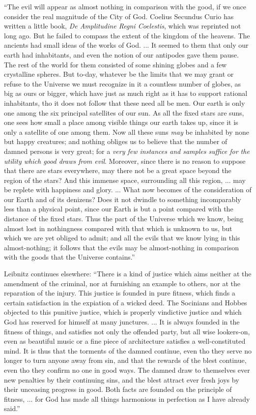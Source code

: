 \documentclass[]{article}
\begin{document}
``The evil will appear as almost nothing in comparison with the good, if
we once consider the real magnitude of the City of God. Coelius Secundus
Curio has written a little book, \emph{De Amplitudine Regni Coelestis}, which
was reprinted not long ago. But he failed to compass the extent of the
kingdom of the heavens. The ancients had small ideas of the works of
God. ... It seemed to them that only our earth had inhabitants, and even
the notion of our antipodes gave them pause. The rest of the world for
them consisted of some shining globes and a few crystalline spheres.
But to-day, whatever be the limits that we may grant or refuse to the
Universe we must recognize in it a countless number of globes, as big
as ours or bigger, which have just as much right as it has to support
rational inhabitants, tho it does not follow that these need all be men.
Our earth is only one among the six principal satellites of our sun. As
all the fixed stars are suns, one sees how small a place among visible
things our earth takes up, since it is only a satellite of one among
them. Now all these suns \emph{may} be inhabited by none but happy creatures;
and nothing obliges us to believe that the number of damned persons is
very great; for a \emph{very few instances and samples suffice for the utility
which good draws from evil}. Moreover, since there is no reason to
suppose that there are stars everywhere, may there not be a great space
beyond the region of the stars? And this immense space, surrounding all
this region, ... may be replete with happiness and glory. ... What now
becomes of the consideration of our Earth and of its denizens? Does it
not dwindle to something incomparably less than a physical point, since
our Earth is but a point compared with the distance of the fixed stars.
Thus the part of the Universe which we know, being almost lost in
nothingness compared with that which is unknown to us, but which we
are yet obliged to admit; and all the evils that we know lying in this
almost-nothing; it follows that the evils may be almost-nothing in
comparison with the goods that the Universe contains.''

Leibnitz continues elsewhere: ``There is a kind of justice which aims
neither at the amendment of the criminal, nor at furnishing an example
to others, nor at the reparation of the injury. This justice is founded
in pure fitness, which finds a certain satisfaction in the expiation
of a wicked deed. The Socinians and Hobbes objected to this punitive
justice, which is properly vindictive justice and which God has reserved
for himself at many junctures. ... It is always founded in the fitness
of things, and satisfies not only the offended party, but all wise
lookers-on, even as beautiful music or a fine piece of architecture
satisfies a well-constituted mind. It is thus that the torments of the
damned continue, even tho they serve no longer to turn anyone away from
sin, and that the rewards of the blest continue, even tho they confirm
no one in good ways. The damned draw to themselves ever new penalties
by their continuing sins, and the blest attract ever fresh joys by their
unceasing progress in good. Both facts are founded on the principle of
fitness, ... for God has made all things harmonious in perfection as I
have already said.''
\end{document}
